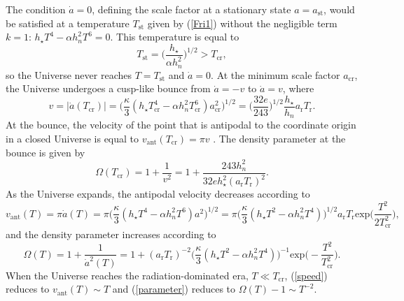 \documentclass[prd,onecolumn,nofootinbib,showpacs]{revtex4}
\begin{document}
The condition $\dot{a}=0$, defining the scale factor at a stationary state $a=a_\textrm{st}$, would be satisfied at a temperature $T_\textrm{st}$ given by (\ref{Fri1}) without the negligible term $k=1$: $h_\star T^4-\alpha h^2_n T^6=0$.
This temperature is equal to
\begin{equation}
T_\textrm{st}=\biggl(\frac{h_\star}{\alpha h^2_n}\biggr)^{1/2}>T_\textrm{cr},
\label{stationary}
\end{equation}
so the Universe never reaches $T=T_\textrm{st}$ and $\dot{a}=0$.
At the minimum scale factor $a_\textrm{cr}$, the Universe undergoes a cusp-like bounce from $\dot{a}=-v$ to $\dot{a}=v$, where
\begin{equation}
v=|\dot{a}(T_\textrm{cr})|=\biggl(\frac{\kappa}{3}(h_\star T^4_\textrm{cr}-\alpha h^2_n T^6_\textrm{cr})a^2_\textrm{cr}\biggr)^{1/2}=\biggl(\frac{32e}{243}\biggr)^{1/2}\frac{h_\star}{h_n}a_\textrm{r} T_\textrm{r}.
\label{velocity}
\end{equation}
At the bounce, the velocity of the point that is antipodal to the coordinate origin in a closed Universe is equal to $v_\textrm{ant}(T_\textrm{cr})=\pi v$ \cite{infl}.
The density parameter at the bounce is given by \cite{infl}
\begin{equation}
\Omega(T_\textrm{cr})=1+\frac{1}{v^2}=1+\frac{243 h^2_n}{32e h^2_\star(a_\textrm{r} T_\textrm{r})^2}.
\label{density}
\end{equation}
As the Universe expands, the antipodal velocity decreases according to
\begin{equation}
v_\textrm{ant}(T)=\pi\dot{a}(T)=\pi\biggl(\frac{\kappa}{3}(h_\star T^4-\alpha h^2_n T^6)a^2\biggr)^{1/2}=\pi\biggl(\frac{\kappa}{3}(h_\star T^2-\alpha h^2_n T^4)\biggr)^{1/2}a_\textrm{r}T_\textrm{r}\mbox{exp}\biggl(\frac{T^2}{2T^2_\textrm{cr}}\biggr),
\label{speed}
\end{equation}
and the density parameter increases according to
\begin{equation}
\Omega(T)=1+\frac{1}{\dot{a}^2(T)}=1+(a_\textrm{r} T_\textrm{r})^{-2}\biggl(\frac{\kappa}{3}(h_\star T^2-\alpha h^2_n T^4)\biggr)^{-1}\mbox{exp}\biggl(-\frac{T^2}{T^2_\textrm{cr}}\biggr).
\label{parameter}
\end{equation}
When the Universe reaches the radiation-dominated era, $T\ll T_\textrm{cr}$, (\ref{speed}) reduces to $v_\textrm{ant}(T)\sim T$ and (\ref{parameter}) reduces to $\Omega(T)-1\sim T^{-2}$.
\end{document}
